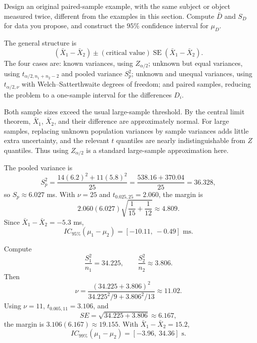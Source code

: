 \begin{problema}\label{prob:ae13605}
Design an original paired-sample example, with the same subject or object measured twice, different from the examples in this section. Compute $\bar D$ and $S_D$ for data you propose, and construct the $95\%$ confidence interval for $\mu_D$.
\end{problema}

\begin{solproblema}
The general structure is
\[
	(\bar X_1-\bar X_2)\pm(\text{critical value})\operatorname{SE}(\bar X_1-\bar X_2).
\]
The four cases are: known variances, using $Z_{\alpha/2}$; unknown but equal variances, using $t_{\alpha/2,n_1+n_2-2}$ and pooled variance $S_p^2$; unknown and unequal variances, using $t_{\alpha/2,\nu}$ with Welch--Satterthwaite degrees of freedom; and paired samples, reducing the problem to a one-sample interval for the differences $D_i$.
\end{solproblema}

\begin{solproblema}
Both sample sizes exceed the usual large-sample threshold. By the central limit theorem, $\bar X_1$, $\bar X_2$, and their difference are approximately normal. For large samples, replacing unknown population variances by sample variances adds little extra uncertainty, and the relevant $t$ quantiles are nearly indistinguishable from $Z$ quantiles. Thus using $Z_{\alpha/2}$ is a standard large-sample approximation here.
\end{solproblema}

\begin{solproblema}[prob:f1e6f4b]
The pooled variance is
\[
	S_p^2=\frac{14(6.2)^2+11(5.8)^2}{25}=\frac{538.16+370.04}{25}=36.328,
\]
so $S_p\approx6.027$ ms. With $\nu=25$ and $t_{0.025,25}=2.060$, the margin is
\[
	2.060(6.027)\sqrt{\frac1{15}+\frac1{12}}\approx4.809.
\]
Since $\bar X_1-\bar X_2=-5.3$ ms,
\[
	IC_{95\%}(\mu_1-\mu_2)=[-10.11,\ -0.49]\text{ ms}.
\]
\end{solproblema}

\begin{solproblema}[prob:51e0d64]
Compute
\[
	\frac{S_1^2}{n_1}=34.225,\qquad \frac{S_2^2}{n_2}\approx3.806.
\]
Then
\[
	\nu=\frac{(34.225+3.806)^2}{34.225^2/9+3.806^2/13}\approx11.02.
\]
Using $\nu=11$, $t_{0.005,11}=3.106$, and
\[
	SE=\sqrt{34.225+3.806}\approx6.167,
\]
the margin is $3.106(6.167)\approx19.155$. With $\bar X_1-\bar X_2=15.2$,
\[
	IC_{99\%}(\mu_1-\mu_2)=[-3.96,\ 34.36]\text{ s}.
\]
\end{solproblema}

